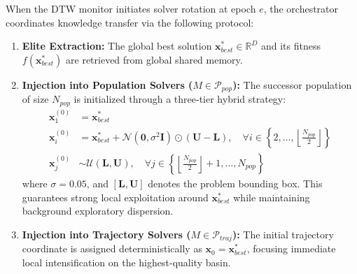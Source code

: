When the DTW monitor initiates solver rotation at epoch $e$, the orchestrator coordinates knowledge transfer via the following protocol:
\begin{enumerate}
    \item \textbf{Elite Extraction:} The global best solution $\mathbf{x}_{best}^* \in \mathbb{R}^D$ and its fitness $f(\mathbf{x}_{best}^*)$ are retrieved from global shared memory.
    \item \textbf{Injection into Population Solvers ($M \in \mathcal{P}_{pop}$):} The successor population of size $N_{pop}$ is initialized through a three-tier hybrid strategy:
    \begin{align}
    \mathbf{x}_1^{(0)} &= \mathbf{x}_{best}^* \label{eq:elite_inj} \\
    \mathbf{x}_i^{(0)} &= \mathbf{x}_{best}^* + \mathcal{N}\left(\mathbf{0}, \sigma^2 \mathbf{I}\right) \odot (\mathbf{U} - \mathbf{L}), \quad \forall i \in \left\{2, \dots, \left\lfloor \frac{N_{pop}}{2} \right\rfloor \right\} \label{eq:gauss_inj} \\
    \mathbf{x}_j^{(0)} &\sim \mathcal{U}(\mathbf{L}, \mathbf{U}), \quad \forall j \in \left\{\left\lfloor \frac{N_{pop}}{2} \right\rfloor + 1, \dots, N_{pop}\right\} \label{eq:unif_inj}
    \end{align}
    where $\sigma = 0.05$, and $[\mathbf{L}, \mathbf{U}]$ denotes the problem bounding box. This guarantees strong local exploitation around $\mathbf{x}_{best}^*$ while maintaining background exploratory dispersion.
    \item \textbf{Injection into Trajectory Solvers ($M \in \mathcal{P}_{traj}$):} The initial trajectory coordinate is assigned deterministically as $\mathbf{x}_0 = \mathbf{x}_{best}^*$, focusing immediate local intensification on the highest-quality basin.
\end{enumerate}

